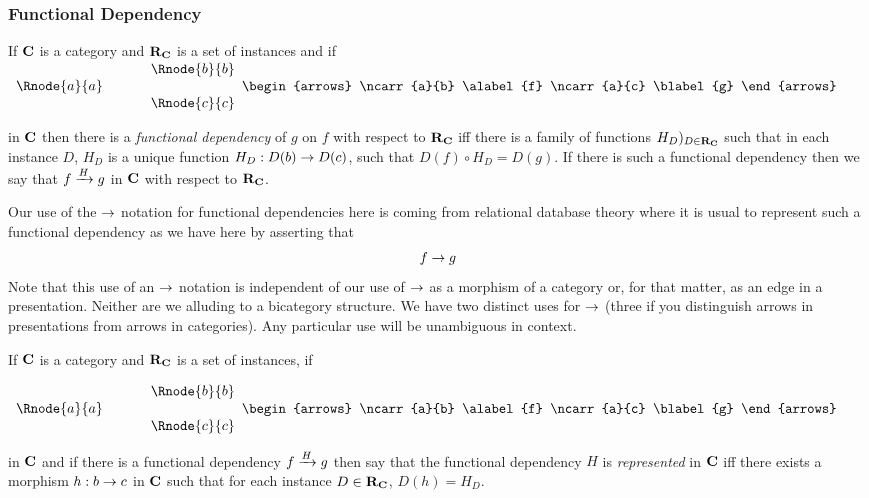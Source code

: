 \documentclass[10pt,a4paper]{article}
\theoremstyle{remark}
\renewcommand{\term}[1]{\textit{#1}}  %
\begin{document}
\subsubsection{Functional Dependency}
\newcommand {\fgsourcediag}{
$
\begin{array}{c p{0.5cm} c  }
             &&   \Rnode{b}{b} \\[0.01cm]
\Rnode{a}{a} &&                \\[0.01cm] 
             &&   \Rnode{c}{c}         
\end{array} 
\begin{arrows}
\ncarr{a}{b}
\alabel{f}
\ncarr{a}{c}
\blabel{g}
\end{arrows}
$  
}
\begin{definition}
If $\catc$ is a category and $\reqtc$ is a set of instances and if \fgsourcediag
in $\catc$ then there is a  \term{functional dependency} of $g$ on $f$ with respect to $\reqtc$ iff
there is a family of functions $H_D)_{D \in \reqtc}$ such that 
in each instance $D$, $H_D$ is a unique function $H_D: D(b) \morph D(c)$, such that $D(f) \circ H_D = D(g)$. 
If there is such a functional dependency then we say that $\fundep{H}{f}{g}$ in $\catc$ with respect to $\reqtc$.
\end{definition}

Our use of the $\morph$ notation for functional dependencies here is coming from relational database theory where it is usual to represent such a functional dependency as we have here by asserting that 
$$
f \morph g
$$
Note that this use of an $\morph$ notation is independent of our use of $\morph$ as a morphism of a category 
or, for that matter, as an edge in a presentation. Neither are we alluding to a bicategory structure. We have two distinct uses for $\morph$ (three if you distinguish arrows in presentations from arrows in categories). Any particular use will be unambiguous in context.

\begin{definition}
If $\catc$ is a category and $\reqtc$ is a set of instances, if
\fgsourcediag
in $\catc$ 
and if there is a functional dependency $\fundep{H}{f}{g}$ then say that 
the functional dependency $H$ is \term{represented} in $\catc$ 
iff there exists a morphism $h:b \morph c$ in $\catc$ such that for each instance $D \in \reqtc$, $D(h)=H_D$.
\end{definition}
\end{document}
